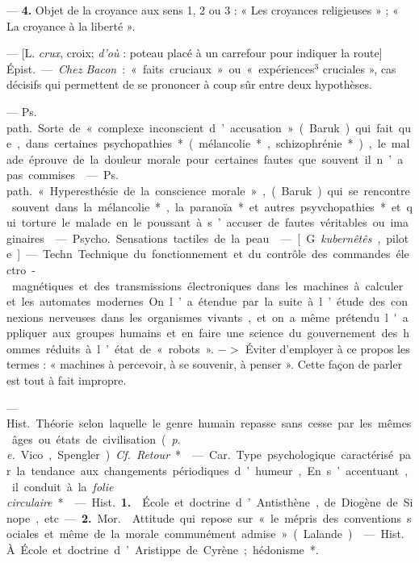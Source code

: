 \begin{itemize}[leftmargin=1cm, label=, itemsep=11pt]
— {\bf 4.}  Objet de la croyance aux
sens 1, 2 ou 3 : « Les croyances religieuses » ; « La croyance à la liberté ».

 — [L. {\it crux}, croix; {\it d’où} : poteau
placé à un carrefour pour indiquer
la route] \si{Épist.} — {\it Chez Bacon} :
« faits cruciaux » ou « expériences$^3$
cruciales », cas décisifs qui permettent de se prononcer à coup sûr entre
deux hypothèses.

 — \si{Ps. path.} Sorte de « complexe inconscient
d’accusation » (Baruk) qui fait que,
dans certaines psychopathies* (mélancolie*, schizophrénie*), le malade
éprouve de la douleur morale pour
certaines fautes que souvent il n’a
pas commises.

 — \si{Ps. path.} « Hyperesthésie de la
conscience morale », (Baruk) qui se rencontre souvent dans la mélancolie*, la
paranoïa* et autres psyvchopathies* et qui torture le malade en le poussant à
s’accuser de fautes véritables ou imaginaires.

 — \si{Psycho.} Sensations tactiles de la peau.

 — [G. {\it kubernêtês}, pilote] —
Techn. Technique du fonctionnement et du contrôle des commandes
électro-magnétiques et des transmissions électroniques dans les machines à calculer et les automates
modernes. On l’a étendue par la suite
à l’étude des connexions nerveuses
dans les organismes vivants, et on a
même prétendu l'appliquer aux
groupes humains et en faire une
science du gouvernement des hommes réduits à l’état de « robots ».
$->$ Éviter d'employer à ce propos
les termes : « machines à percevoir,
à se souvenir, à penser ». Cette façon
de parler est tout à fait impropre.

 —  \si{Hist.} Théorie selon laquelle
le genre humain repasse sans cesse par les mêmes âges ou états de
civilisation ({\it p. e.} Vico, Spengler). {\it Cf.} {\it Retour}*.

 — \si{Car.} Type psychologique caractérisé par la tendance
aux changements périodiques d’humeur, En s’accentuant, il conduit à
la {\it folie circulaire}*.

 — \si{Hist.} {\bf 1.}  École et doctrine d’Antisthène, de Diogène de
Sinope, etc.

— {\bf 2.} \si{Mor.}  Attitude qui repose
sur « le mépris des conventions sociales et même de la morale communément admise » (Lalande).

 — \si{Hist.} À. École et doctrine d’Aristippe de Cyrène; hédonisme*.

	\end{itemize}
